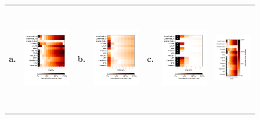 \begin{figure}
\centering

\begin{tabular}{p{0.01cm} p{4.6cm} p{0.01cm} p{4.6cm} p{0.01cm} p{4.6cm} p{0.9cm}}
\textbf{a.} & {\includegraphics[clip, trim=0.4cm 3.3cm 1.0cm 1.2cm, width=4.6cm]{figs/Stages.pdf}} &
\textbf{b.} & {\includegraphics[clip, trim=0.4cm 3.31cm 1.0cm 1.2cm, width=4.6cm]{figs/Registers.pdf}} &
\textbf{c.} & {\includegraphics[clip, trim=0.4cm 3.31cm 1.0cm 1.2cm, width=4.6cm]{figs/ScalarIns.pdf}} &
{\includegraphics[clip, trim=6.4cm 0.4cm 0.4cm 0.4cm, height=4.6cm]{figs/Scale.pdf}} \\
 


\end{tabular}
\end{figure}
